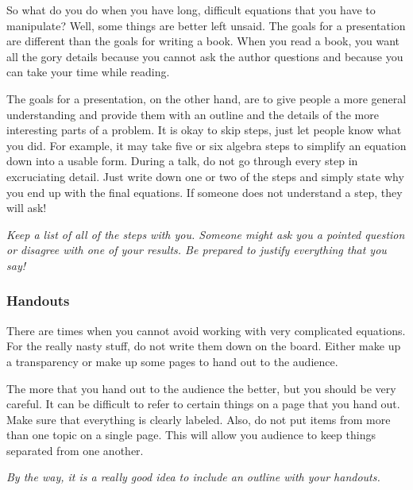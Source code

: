 So what do you do when you have long, difficult equations that you
have to manipulate? Well, some things are better left unsaid. The
goals for a presentation are different than the goals for writing a
book. When you read a book, you want all the gory details because you
cannot ask the author questions and because you can take your time
while reading.

The goals for a presentation, on the other hand, are to give people a
more general understanding and provide them with an outline and the
details of the more interesting parts of a problem. It is okay to skip
steps, just let people know what you did. For example, it may take
five or six algebra steps to simplify an equation down into a usable
form. During a talk, do not go through every step in excruciating
detail. Just write down one or two of the steps and simply state why
you end up with the final equations. If someone does not understand a
step, they will ask!

\textit{Keep a list of all of the steps with you. Someone might ask
  you a pointed question or disagree with one of your results. Be
  prepared to justify everything that you say!}

\subsubsection{Handouts}
There are times when you cannot avoid working with very complicated
equations. For the really nasty stuff, do not write them down on the
board. Either make up a transparency or make up some pages to hand out
to the audience. 

The more that you hand out to the audience the better, but you should
be very careful. It can be difficult to refer to certain things on a
page that you hand out. Make sure that everything is clearly labeled.
Also, do not put items from more than one topic on a single page. This
will allow you audience to keep things separated from one another.

\textit{By the way, it is a really good idea to include an outline
  with your handouts.}


